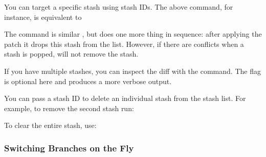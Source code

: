 \begin{flushleft}
	You can target a specific stash using stash IDs. The above command, for instance,
	is equivalent to
\end{flushleft}

\begin{flushleft}
\end{flushleft}

\begin{flushleft}
	The  command is similar , but does one more thing in sequence:
	after applying the patch it drops this stash from the list. However, if there are
	conflicts when a stash is popped,  will not remove the stash.
\end{flushleft}

\begin{flushleft}
\end{flushleft}

\begin{flushleft}
	If you have multiple stashes, you can inspect the diff with the  command.
	The  flag is optional here and produces a more verbose output.
\end{flushleft}

\begin{flushleft}
\end{flushleft}

\begin{flushleft}
	You can pass a stash ID to delete an individual stash from the stash list. For
	example, to remove the second stash run:
\end{flushleft}

\begin{flushleft}
\end{flushleft}

\begin{flushleft}
	To clear the entire stash, use:
\end{flushleft}

\begin{flushleft}
\end{flushleft}

\subsubsection{Switching Branches on the Fly}

